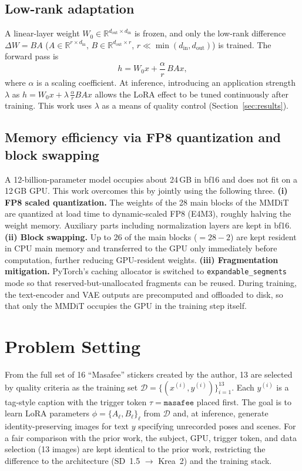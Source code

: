 \documentclass[10pt,twocolumn]{article}
\begin{document}
\subsection{Low-rank adaptation}
A linear-layer weight $W_0\in\mathbb{R}^{d_\text{out}\times d_\text{in}}$ is frozen, and only the low-rank difference $\Delta W=BA$ ($A\in\mathbb{R}^{r\times d_\text{in}},\,B\in\mathbb{R}^{d_\text{out}\times r}$, $r\ll\min(d_\text{in},d_\text{out})$) is trained. The forward pass is
\begin{equation}
h = W_0 x + \frac{\alpha}{r}\,B A x ,
\label{eq:lora}
\end{equation}
where $\alpha$ is a scaling coefficient. At inference, introducing an application strength $\lambda$ as $h=W_0x+\lambda\,\frac{\alpha}{r}BAx$ allows the LoRA effect to be tuned continuously after training. This work uses $\lambda$ as a means of quality control (Section~\ref{sec:results}).

\subsection{Memory efficiency via FP8 quantization and block swapping}
\label{sec:mem}
A 12-billion-parameter model occupies about 24\,GB in bf16 and does not fit on a 12\,GB GPU. This work overcomes this by jointly using the following three.
\textbf{(i) FP8 scaled quantization.} The weights of the 28 main blocks of the MMDiT are quantized at load time to dynamic-scaled FP8 (E4M3), roughly halving the weight memory. Auxiliary parts including normalization layers are kept in bf16.
\textbf{(ii) Block swapping.} Up to 26 of the main blocks ($=28-2$) are kept resident in CPU main memory and transferred to the GPU only immediately before computation, further reducing GPU-resident weights.
\textbf{(iii) Fragmentation mitigation.} PyTorch's caching allocator is switched to \texttt{expandable\_segments} mode so that reserved-but-unallocated fragments can be reused.
During training, the text-encoder and VAE outputs are precomputed and offloaded to disk, so that only the MMDiT occupies the GPU in the training step itself.

\section{Problem Setting}
From the full set of 16 ``Masafee'' stickers created by the author, 13 are selected by quality criteria as the training set $\mathcal{D}=\{(x^{(i)},y^{(i)})\}_{i=1}^{13}$. Each $y^{(i)}$ is a tag-style caption with the trigger token $\tau=\texttt{masafee}$ placed first. The goal is to learn LoRA parameters $\phi=\{A_\ell,B_\ell\}_\ell$ from $\mathcal{D}$ and, at inference, generate identity-preserving images for text $y$ specifying unrecorded poses and scenes. For a fair comparison with the prior work, the subject, GPU, trigger token, and data selection (13 images) are kept identical to the prior work, restricting the difference to the architecture (SD~1.5 $\to$ Krea~2) and the training stack.
\end{document}
